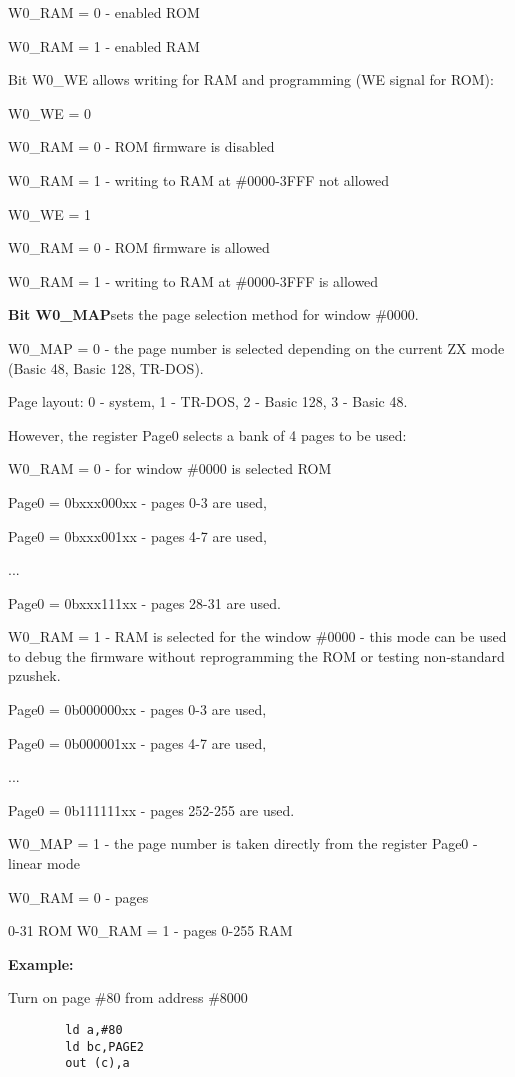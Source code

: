 \documentclass{article}
\begin{document}
W0\_RAM = 0 - enabled ROM

W0\_RAM = 1 - enabled RAM

Bit W0\_WE allows writing for RAM and programming (WE signal for ROM):

W0\_WE = 0

W0\_RAM = 0 - ROM firmware is disabled

W0\_RAM = 1 - writing to RAM at \#0000-3FFF not allowed

W0\_WE = 1

W0\_RAM = 0 - ROM firmware is allowed

W0\_RAM = 1 - writing to RAM at \#0000-3FFF is allowed

\textbf{Bit W0\_MAP}sets the page selection method for window \#0000.

W0\_MAP = 0 - the page number is selected depending on the current ZX
mode (Basic 48, Basic 128, TR-DOS).

Page layout: 0 - system, 1 - TR-DOS, 2 - Basic 128, 3 - Basic 48.

However, the register Page0 selects a bank of 4 pages to be used:

W0\_RAM = 0 - for window \#0000 is selected ROM

Page0 = 0bxxx000xx - pages 0-3 are used,

Page0 = 0bxxx001xx - pages 4-7 are used,

...

Page0 = 0bxxx111xx - pages 28-31 are used.

W0\_RAM = 1 - RAM is selected for the window \#0000 - this mode can be
used to debug the firmware without reprogramming the ROM or testing
non-standard pzushek.

Page0 = 0b000000xx - pages 0-3 are used,

Page0 = 0b000001xx - pages 4-7 are used,

...

Page0 = 0b111111xx - pages 252-255 are used.

W0\_MAP = 1 - the page number is taken directly from the register
Page0 - linear mode

W0\_RAM = 0 - pages

0-31 ROM W0\_RAM = 1 - pages 0-255 RAM

\textbf{Example:}

Turn on page \#80 from address \#8000

\begin{verbatim}
		ld a,#80
		ld bc,PAGE2
		out (c),a
\end{verbatim}
\end{document}
